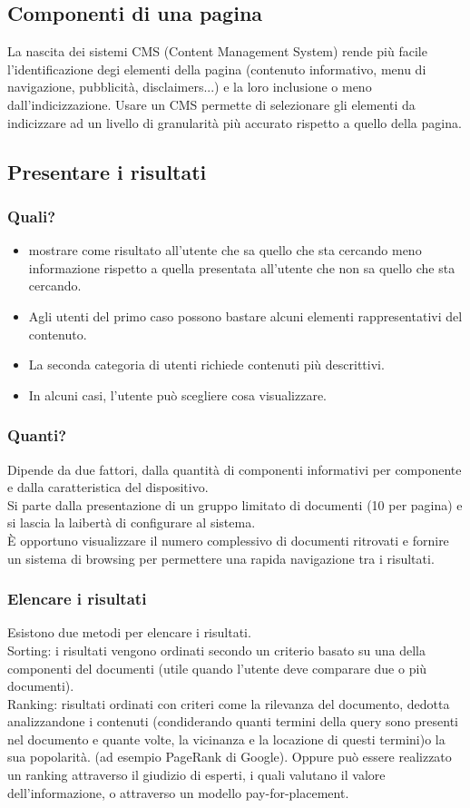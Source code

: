 \documentclass{article}
\begin{document}
\subsection{Componenti di una pagina}
La nascita dei sistemi CMS (Content Management System) rende più facile l'identificazione degi elementi della pagina (contenuto informativo, menu di navigazione, pubblicità, disclaimers...) e la loro inclusione o meno dall'indicizzazione. Usare un CMS permette di selezionare gli elementi da indicizzare ad un livello di granularità più accurato rispetto a quello della pagina.
\subsection{Presentare i risultati}
\subsubsection{Quali?}
\begin{itemize}
	\item mostrare come risultato all'utente che sa quello che sta cercando meno informazione rispetto a quella presentata all'utente che non sa quello che sta cercando.
	\item Agli utenti del primo caso possono bastare alcuni elementi rappresentativi del contenuto.
	\item La seconda categoria di utenti richiede contenuti più descrittivi.
	\item In alcuni casi, l'utente può scegliere cosa visualizzare.
\end{itemize}
\subsubsection{Quanti?}
Dipende da due fattori, dalla quantità di componenti informativi per componente e dalla caratteristica del dispositivo.\\
Si parte dalla presentazione di un gruppo limitato di documenti (10 per pagina) e si lascia la laibertà di configurare al sistema.\\
È opportuno visualizzare il numero complessivo di documenti ritrovati e fornire un sistema di browsing per permettere una rapida navigazione tra i risultati.
\subsubsection{Elencare i risultati}
Esistono due metodi per elencare i risultati.\\
Sorting: i risultati vengono ordinati secondo un criterio basato su una della componenti del documenti (utile quando l'utente deve comparare due o più documenti).\\
Ranking: risultati ordinati con criteri come la rilevanza del documento, dedotta analizzandone i contenuti (condiderando quanti termini della query sono presenti nel documento e quante volte, la vicinanza e la locazione di questi termini)o la sua popolarità. (ad esempio PageRank di Google). Oppure può essere realizzato un ranking attraverso il giudizio di esperti, i quali valutano il valore dell'informazione, o attraverso un modello pay-for-placement.
\end{document}
